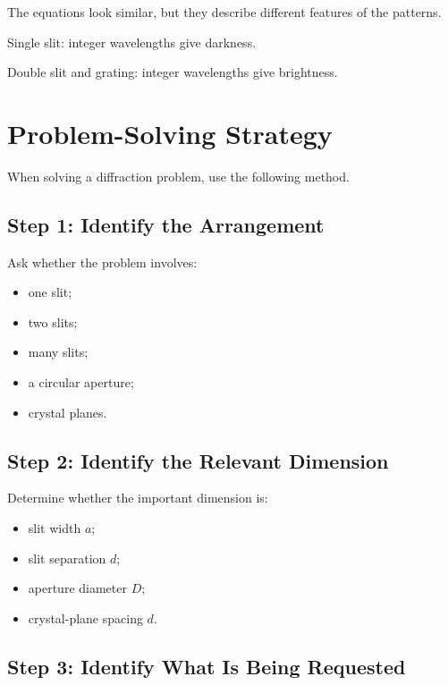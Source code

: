 \documentclass{studentnotes}
\begin{document}
The equations look similar, but they describe different features of the patterns.

\begin{remembernote}
    Single slit: integer wavelengths give darkness.

    Double slit and grating: integer wavelengths give brightness.
\end{remembernote}

\section{Problem-Solving Strategy}

When solving a diffraction problem, use the following method.

\subsection{Step 1: Identify the Arrangement}

Ask whether the problem involves:

\begin{itemize}
    \item one slit;
    \item two slits;
    \item many slits;
    \item a circular aperture;
    \item crystal planes.
\end{itemize}

\subsection{Step 2: Identify the Relevant Dimension}

Determine whether the important dimension is:

\begin{itemize}
    \item slit width \(a\);
    \item slit separation \(d\);
    \item aperture diameter \(D\);
    \item crystal-plane spacing \(d\).
\end{itemize}

\subsection{Step 3: Identify What Is Being Requested}
\end{document}
